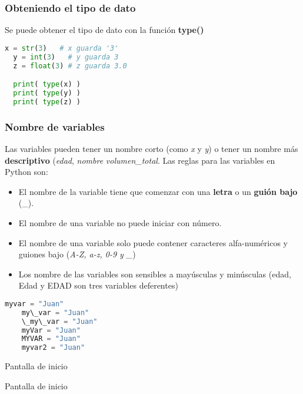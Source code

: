 \begin{frame}[fragile]
  \frametitle{Obteniendo el tipo de dato}

  Se puede obtener el tipo de dato con la función \textbf{type()}

  \begin{lstlisting}[language=Python]
  x = str(3)   # x guarda '3'
  y = int(3)   # y guarda 3
  z = float(3) # z guarda 3.0

  print( type(x) )
  print( type(y) )
  print( type(z) )
  \end{lstlisting}
\end{frame}

\begin{frame}[fragile]
  \frametitle{Nombre de variables}

  Las variables pueden tener un nombre corto (como \textit{x} y \textit{y})
  o tener un nombre más \textbf{descriptivo} (\textit{edad}, \textit{nombre} 
  \textit{volumen\_total}. Las reglas para las variables en Python son:

  \begin{itemize}
    \item El nombre de la variable tiene que comenzar con una \textbf{letra} o
      un \textbf{guión bajo} (\_).
    \item El nombre de una variable no puede iniciar con número.
    \item El nombre de una variable solo puede contener caracteres
      alfa-numéricos y guiones bajo (\textit{A-Z, a-z, 0-9 y \_})
    \item Los nombre de las variables son sensibles a mayúsculas y minúsculas
      (edad, Edad y EDAD son tres variables deferentes)
  \end{itemize}

  \begin{lstlisting}[language=Python]
    myvar = "Juan"
    my\_var = "Juan"
    \_my\_var = "Juan"
    myVar = "Juan"
    MYVAR = "Juan"
    myvar2 = "Juan"
  \end{lstlisting}
\end{frame}

\begin{frame}[c]{Pantalla de inicio}
    \begin{center}
        Pantalla de inicio
    \end{center}
\end{frame}
